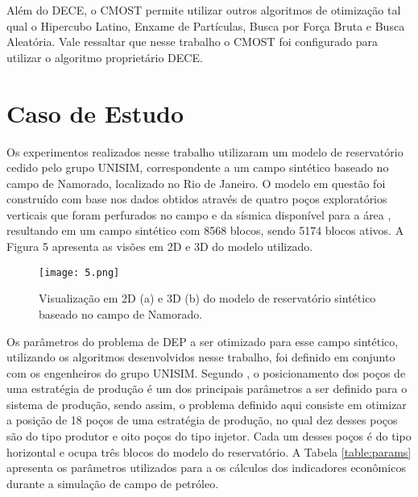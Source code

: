 Além do DECE, o CMOST permite utilizar outros algoritmos de otimização tal qual o Hipercubo Latino, Enxame de Partículas, Busca por Força Bruta e Busca Aleatória. Vale ressaltar que nesse trabalho o CMOST foi configurado para utilizar o algoritmo proprietário DECE.

\section{Caso de Estudo}

Os experimentos realizados nesse trabalho utilizaram um modelo de reservatório cedido pelo grupo UNISIM, correspondente a um campo sintético baseado no campo de Namorado, localizado no Rio de Janeiro. O modelo em questão foi construído com base nos dados obtidos através de quatro poços exploratórios verticais que foram perfurados no campo e da sísmica disponível para a área \cite{Silva2016}, resultando em um campo sintético com 8568 blocos, sendo 5174 blocos ativos. A Figura 5 apresenta as visões em 2D e 3D do modelo utilizado.

\begin{figure}[htb]

\texttt{[image: 5.png]}

\caption{Visualização em 2D (a) e 3D (b) do modelo de reservatório sintético baseado no campo de Namorado.}


\end{figure}

Os parâmetros do problema de DEP a ser otimizado para esse campo sintético, utilizando os algoritmos desenvolvidos nesse trabalho, foi definido em conjunto com os engenheiros do grupo UNISIM. Segundo , o posicionamento dos poços de uma estratégia de produção é um dos principais parâmetros a ser definido para o sistema de produção, sendo assim, o problema definido aqui consiste em otimizar a posição de 18 poços de uma estratégia de produção, no qual dez desses poços são do tipo produtor e oito poços do tipo injetor. Cada um desses poços é do tipo horizontal e ocupa três blocos do modelo do reservatório. A Tabela \ref{table:params} apresenta os parâmetros utilizados para a os cálculos dos indicadores econômicos durante a simulação de campo de petróleo.

